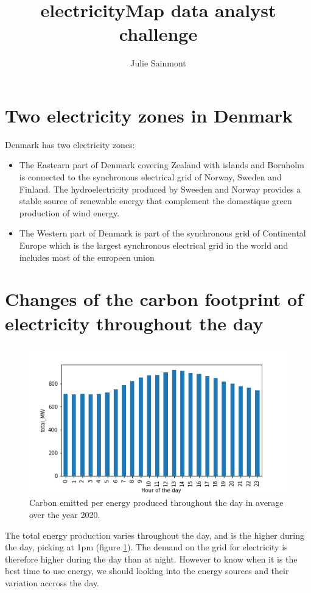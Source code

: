 \documentclass[11pt]{article} %
\title{electricityMap data analyst challenge}
\author{Julie Sainmont}
\begin{document}
\maketitle

\section{Two electricity zones in Denmark}

Denmark has two electricity zones:
\begin{itemize}
\item The Eastearn part of Denmark covering Zealand with islands and Bornholm is connected to the synchronous electrical grid of Norway, Sweden and Finland. The hydroelectricity produced by Sweeden and Norway provides a stable source of renewable energy that complement the domestique green production of wind energy.
\item The Western part of Denmark is part of the synchronous grid of Continental Europe which is the largest  synchronous electrical grid in the world and includes most of the europeen union
\end{itemize}

\section{Changes of the carbon footprint of electricity throughout the day}
\begin{figure}
  \includegraphics[width=0.8\linewidth]{../outputs/total_MW.png}
  \caption{Carbon emitted per energy produced throughout the day in average over the year 2020.}
  \label{fig:total_kwh}
\end{figure}
The total energy production varies throughout the day, and is the higher during the day, picking at 1pm (figure \ref{fig:total_kwh}). The demand on the grid for electricity is therefore higher during the day than at night. However to know when it is the best time to use energy, we should looking into the energy sources and their variation accross the day.\\
\end{document}
